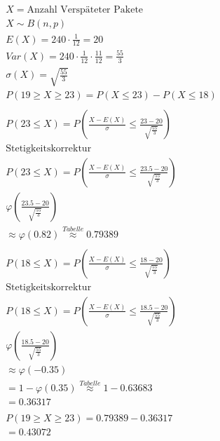 \begin{align*}
    X = \text{Anzahl Verspäteter Pakete}                                                            \\
    X \sim B(n, p)                                                                                  \\
    E(X) = 240 \cdot \frac{1}{12} = 20                                                              \\
    Var(X) = 240 \cdot \frac{1}{12} \cdot \frac{11}{12} = \frac{55}{3}                              \\
    \sigma(X) = \sqrt{\frac{55}{3}}                                                                 \\
    P(19 \geq X \geq 23) = P(X \leq 23) - P(X \leq 18)                                              \\\\
    P(23 \leq X) = P\left(\frac{X - E(X)}{\sigma} \leq \frac{23 - 20}{\sqrt{\frac{55}{3}}}\right)   \\
    \text{Stetigkeitskorrektur }                                                                    \\
    P(23 \leq X) = P\left(\frac{X - E(X)}{\sigma} \leq \frac{23.5 - 20}{\sqrt{\frac{55}{3}}}\right) \\
    \varphi\left(\frac{23.5 - 20}{\sqrt{\frac{55}{3}}}\right)                                       \\
    \approx \varphi(0.82) \overset{Tabelle}{\approx} 0.79389                                        \\\\
    P(18 \leq X) = P\left(\frac{X - E(X)}{\sigma} \leq \frac{18 - 20}{\sqrt{\frac{55}{3}}}\right)   \\
    \text{Stetigkeitskorrektur}                                                                     \\
    P(18 \leq X) = P\left(\frac{X - E(X)}{\sigma} \leq \frac{18.5 - 20}{\sqrt{\frac{55}{3}}}\right) \\
    \varphi\left(\frac{18.5 - 20}{\sqrt{\frac{55}{3}}}\right)                                       \\
    \approx \varphi\left(-0.35\right)                                                               \\
    = 1 - \varphi\left(0.35\right) \overset{Tabelle}{\approx} 1 - 0.63683                           \\
    = 0.36317                                                                                       \\\\
    P(19 \geq X \geq 23) = 0.79389 - 0.36317                                                        \\
    = 0.43072
\end{align*}

